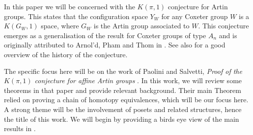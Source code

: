 \documentclass[class=guthesis, crop=false]{standalone}
\begin{document}
In this paper we will be concerned with the $K(\pi,1)$ conjecture for Artin groups. This states that the configuration space $Y_W$ for any Coxeter group $W$ is a $K(G_W, 1)$ space, where $G_W$ is the Artin group associated to $W$. This conjecture emerges as a generalisation of the result for Coxeter groups of type $A_n$ and is originally attributed to Arnol'd, Pham and Thom in \cite{lek_homotopy_1983}. See also \cite{charney_davis_pi_1995} for a good overview of the history of the conjecture.

The specific focus here will be on the work of Paolini and Salvetti, \emph{Proof of the $K(\pi, 1)$ conjecture for affine Artin groups} \cite{paolini_salvetti_kpi1_2021}. In this work, we will review some theorems in that paper and provide relevant background. Their main Theorem relied on proving a chain of homotopy equivalences, which will be our focus here. A strong theme will be the involvement of posets and related structures, hence the title of this work. We will begin by providing a birds eye view of the main results in \cite{paolini_salvetti_kpi1_2021}.
\end{document}

